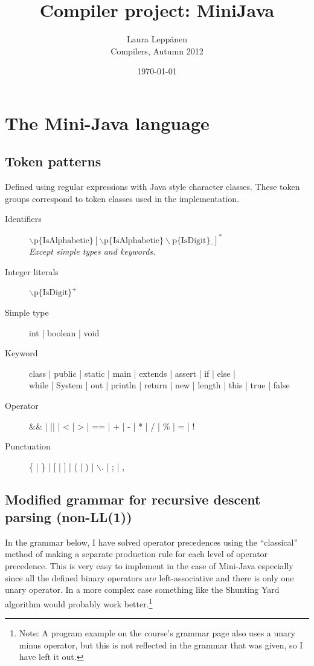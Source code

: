 \documentclass[a4paper,11pt]{article}
\begin{document}
\title{Compiler project: MiniJava}
\author{Laura Leppänen \\ Compilers, Autumn 2012}
\date{\today}
\maketitle
\thispagestyle{empty}

\tableofcontents
\onehalfspacing

\newpage
\setcounter{page}{1}

\section{The Mini-Java language}

\subsection{Token patterns}

Defined using regular expressions with Java style character classes. These token groups correspond to token classes used in the implementation.

\begin{description}
\item[Identifiers] $\backslash\text{p\{IsAlphabetic\}} [ \backslash\text{p\{IsAlphabetic\}}\backslash\text{p\{IsDigit\}\_ } ]^{*}$ \\ \emph{Except simple types and keywords.}
\item[Integer literals] $\backslash\text{p\{IsDigit\}}^{+}$
\item[Simple type] int | boolean | void
\item[Keyword] class | public | static | main | extends | assert | if | else | \\ while | System | out | println | return | new | length | this | true | false
\item[Operator] \&\& | || | < | > | == | + | - | *  | / | \% | = | !
\item[Punctuation] \{ | \} | [ | ] | ( | ) | $\backslash$. | ; | ,
\end{description}

\subsection{Modified grammar for recursive descent parsing (non-LL(1))}

In the grammar below, I have solved operator precedences using the ``classical'' method of making a separate production rule for each level of operator precedence. This is very easy to implement in the case of Mini-Java especially since all the defined binary operators are left-associative and there is only one unary operator. In a more complex case something like the Shunting Yard algorithm would probably work better.\footnote{Note: A program example on the course's grammar page also uses a unary minus operator, but this is not reflected in the grammar that was given, so I have left it out.}
\end{document}
